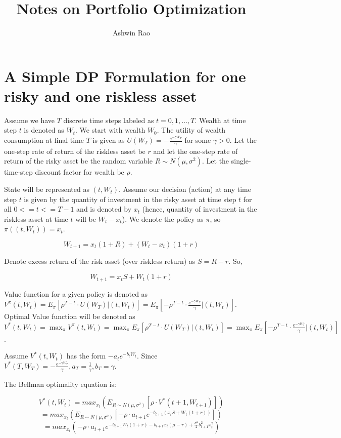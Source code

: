 \documentclass[12pt]{amsart}
\title{Notes on Portfolio Optimization}
\author{Ashwin Rao}
\date{} %
\begin{document}
\maketitle

\section{A Simple DP Formulation for one risky and one riskless asset}

Assume we have $T$ discrete time steps labeled as $t = 0, 1, \ldots, T$. Wealth at time step $t$ is denoted as $W_t$. We start with wealth $W_0$. The utility of wealth consumption at final time $T$ is given as $U(W_T) = - \frac {e^{-\gamma W_T}} {\gamma}$ for some $\gamma > 0$. Let the one-step rate of return of the riskless asset be $r$ and let the one-step rate of return of the risky asset be the random variable $R \sim N(\mu, \sigma^2)$. Let the single-time-step discount factor for wealth be $\rho$.

State will be represented as $(t, W_t)$. Assume our decision (action) at any time step $t$ is given by the quantity of investment in the risky asset at time step $t$ for all $0 <= t <= T-1$ and is denoted by $x_t$ (hence, quantity of investment in the riskless asset at time $t$ will be $W_t - x_t$). We denote the policy as $\pi$, so $\pi((t, W_t)) = x_t$.

$$W_{t+1} = x_t (1 + R) + (W_t - x_t) (1 + r)$$

Denote excess return of the risk asset (over riskless return) as $S = R - r$. So,

$$W_{t+1} = x_t S + W_t (1 + r)$$



Value function for a given policy is denoted as $V^{\pi}(t, W_t) = E_{\pi}[\rho^{T-t} \cdot U(W_T) | (t, W_t)] = E_{\pi}[- \rho^{T-t} \cdot \frac {e^{-\gamma W_T}} {\gamma} | (t, W_t)]$. Optimal Value function will be denoted as $V^*(t, W_t) = \max_{\pi} V^{\pi}(t, W_t) = \max_{\pi} E_{\pi}[\rho^{T-t} \cdot U(W_T) | (t, W_t)] = \max_{\pi} E_{\pi}[-\rho^{T-t} \cdot \frac {e^{-\gamma W_T}} {\gamma} | (t, W_t)]$.

 Assume $V^*(t, W_t)$ has the form $-a_t e^{-b_t W_t}$. Since $V^*(T, W_T) = - \frac {e^{-\gamma W_T}} {\gamma}, a_T = \frac 1 {\gamma}, b_T = \gamma$.

The Bellman optimality equation is:

$$V^*(t, W_t) = max_{x_t} (E_{R \sim N(\mu, \sigma^2)}[\rho \cdot V^*(t+1, W_{t+1})])$$
$$ = max_{x_t} (E_{R \sim N(\mu, \sigma^2)} [- \rho \cdot a_{t+1} e^{-b_{t+1} (x_t S + W_t(1+r))}])$$
$$ = max_{x_t} (- \rho \cdot a_{t+1} e^{-b_{t+1}W_t(1+r) - b_{t+1} x_t (\mu - r) + \frac {\sigma^2} {2} b^2_{t+1} x_t^2})$$
\end{document}
